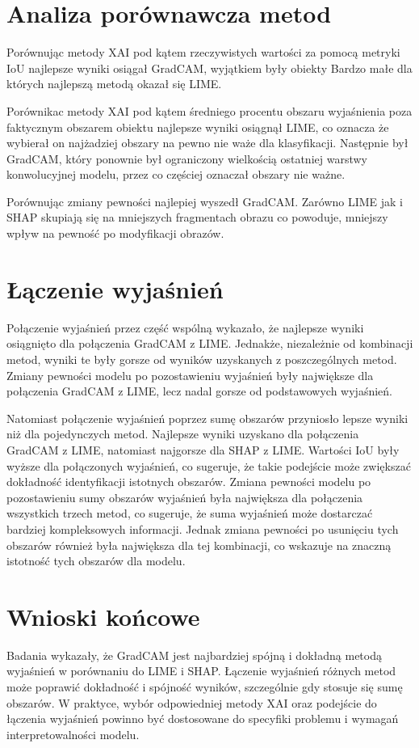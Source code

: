 \section*{Analiza porównawcza metod}

Porównując metody XAI pod kątem rzeczywistych wartości za pomocą metryki IoU najlepsze wyniki osiągał GradCAM, wyjątkiem były obiekty Bardzo małe dla których najlepszą metodą okazał się LIME.

Porównikac metody XAI pod kątem średniego procentu obszaru wyjaśnienia poza faktycznym obszarem obiektu najlepsze wyniki osiągnął LIME, co oznacza że wybierał on najżadziej obszary na pewno nie waże dla klasyfikacji.
Następnie był GradCAM, który ponownie był ograniczony wielkością ostatniej warstwy konwolucyjnej modelu, przez co częściej oznaczał obszary nie ważne.

Porównując zmiany pewności najlepiej wyszedł GradCAM.
Zarówno LIME jak i SHAP skupiają się na mniejszych fragmentach obrazu co powoduje, mniejszy wpływ na pewność po modyfikacji obrazów.

\section*{Łączenie wyjaśnień}

Połączenie wyjaśnień przez część wspólną wykazało, że najlepsze wyniki osiągnięto dla połączenia GradCAM z LIME.
Jednakże, niezależnie od kombinacji metod, wyniki te były gorsze od wyników uzyskanych z poszczególnych metod.
Zmiany pewności modelu po pozostawieniu wyjaśnień były największe dla połączenia GradCAM z LIME, lecz nadal gorsze od podstawowych wyjaśnień.

Natomiast połączenie wyjaśnień poprzez sumę obszarów przyniosło lepsze wyniki niż dla pojedynczych metod.
Najlepsze wyniki uzyskano dla połączenia GradCAM z LIME, natomiast najgorsze dla SHAP z LIME.
Wartości IoU były wyższe dla połączonych wyjaśnień, co sugeruje, że takie podejście może zwiększać dokładność identyfikacji istotnych obszarów.
Zmiana pewności modelu po pozostawieniu sumy obszarów wyjaśnień była największa dla połączenia wszystkich trzech metod, co sugeruje, że suma wyjaśnień może dostarczać bardziej kompleksowych informacji.
Jednak zmiana pewności po usunięciu tych obszarów również była największa dla tej kombinacji, co wskazuje na znaczną istotność tych obszarów dla modelu.

\section*{Wnioski końcowe}

Badania wykazały, że GradCAM jest najbardziej spójną i dokładną metodą wyjaśnień w porównaniu do LIME i SHAP.
Łączenie wyjaśnień różnych metod może poprawić dokładność i spójność wyników, szczególnie gdy stosuje się sumę obszarów.
W praktyce, wybór odpowiedniej metody XAI oraz podejście do łączenia wyjaśnień powinno być dostosowane do specyfiki problemu i wymagań interpretowalności modelu.

